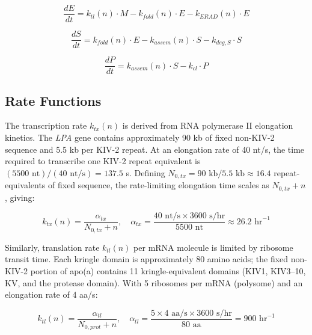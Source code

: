 \documentclass[12pt,letterpaper]{article}
\begin{document}
\begin{equation} \label{eq:2}
    \frac{dE}{dt} = k_{tl}(n) \cdot M - k_{fold}(n) \cdot E - k_{ERAD}(n) \cdot E
\end{equation}

\begin{equation} \label{eq:3}
    \frac{dS}{dt} = k_{fold}(n) \cdot E - k_{assem}(n) \cdot S - k_{deg,S} \cdot S    
\end{equation}


\begin{equation} \label{eq:4}
    \frac{dP}{dt} = k_{assem}(n) \cdot S - k_{cl} \cdot P
\end{equation}

\subsection{Rate Functions} \label{sec:rate-fns}

The transcription rate $k_{tx}(n)$ is derived from RNA polymerase II elongation kinetics. The \textit{LPA} gene contains approximately 90 kb\citep{schmidt2016structure, mclean1987cdna} of fixed non-KIV-2 sequence and 5.5 kb per KIV-2 repeat\citep{mclean1987cdna}. At an elongation rate of 40 nt/s,\citep{jonkers2015getting} the time required to transcribe one KIV-2 repeat equivalent is $(5500 \text{ nt}) / (40 \text{ nt/s}) = 137.5$ s. Defining $N_{0,tx} = 90\text{ kb} / 5.5\text{ kb} \approx 16.4$ repeat-equivalents of fixed sequence, the rate-limiting elongation time scales as $N_{0,tx} + n$, giving:

\begin{equation} \label{eq:5}
    k_{tx}(n) = \frac{\alpha_{tx}}{N_{0,tx} + n}, \quad \alpha_{tx} = \frac{40 \text{ nt/s} \times 3600 \text{ s/hr}}{5500 \text{ nt}} \approx 26.2 \text{ hr}^{-1}
\end{equation}

Similarly, translation rate $k_{tl}(n)$ per mRNA molecule is limited by ribosome transit time. Each kringle domain is approximately 80 amino acids\citep{schmidt2016structure}; the fixed non-KIV-2 portion of apo(a) contains 11 kringle-equivalent domains (KIV1, KIV3--10, KV, and the protease domain)\citep{coassin2022lipoprotein}. With 5 ribosomes per mRNA (polysome) and an elongation rate of 4 aa/s\citep{ingolia2011ribosome}:

\begin{equation} \label{eq:6}
    k_{tl}(n) = \frac{\alpha_{tl}}{N_{0,prot} + n}, \quad \alpha_{tl} = \frac{5 \times 4 \text{ aa/s} \times 3600 \text{ s/hr}}{80 \text{ aa}} = 900 \text{ hr}^{-1}
\end{equation}
\end{document}
